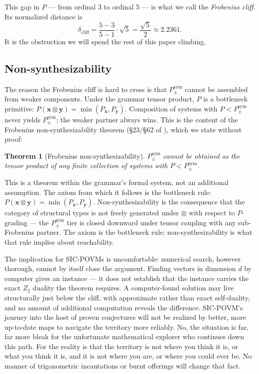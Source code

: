 \documentclass[12pt]{article}
\theoremstyle{plain}
\newtheorem{theoreminner}{Theorem}[section]
\theoremstyle{definition}
\theoremstyle{remark}
\newenvironment{theorem}{\begin{mdframed}[style=thmstyle]\begin{theoreminner}}{\end{theoreminner}\end{mdframed}}
\begin{document}
This gap in $P$ — from ordinal 3 to ordinal 5 — is what we call the \emph{Frobenius cliff}. Its normalized distance is
\[
  \delta_{\mathrm{cliff}} = \frac{5 - 3}{5 - 1} \cdot \sqrt{5} = \frac{\sqrt{5}}{2} \approx 2.2361.
\]
It is the obstruction we will spend the rest of this paper climbing.

\subsection{Non-synthesizability}

The reason the Frobenius cliff is hard to cross is that $P_\pm^{\mathrm{sym}}$ cannot be assembled from weaker components. Under the grammar tensor product, $P$ is a bottleneck primitive: $P(\mathbf{x} \otimes \mathbf{y}) = \min(P_\mathbf{x}, P_\mathbf{y})$. Composition of systems with $P < P_\pm^{\mathrm{sym}}$ never yields $P_\pm^{\mathrm{sym}}$; the weaker partner always wins. This is the content of the Frobenius non-synthesizability theorem (§23/§62 of \cite{synthref}), which we state without proof:

\begin{theorem}[Frobenius non-synthesizability]
  \label{thm:nonsyn}
  $P_\pm^{\mathrm{sym}}$ cannot be obtained as the tensor product of any finite collection of systems with $P < P_\pm^{\mathrm{sym}}$.
\end{theorem}

This is a theorem within the grammar's formal system, not an additional assumption. The axiom from which it follows is the bottleneck rule: $P(\mathbf{x} \otimes \mathbf{y}) = \min(P_\mathbf{x}, P_\mathbf{y})$. Non-synthesizability is the consequence that the category of structural types is not freely generated under $\otimes$ with respect to $P$-grading — the $P_\pm^{\mathrm{sym}}$ tier is closed downward under tensor coupling with any sub-Frobenius partner. The axiom is the bottleneck rule; non-synthesizability is what that rule implies about reachability.

The implication for SIC-POVMs is uncomfortable: numerical search, however thorough, cannot by itself close the argument. Finding vectors in dimension $d$ by computer gives an instance — it does not establish that the instance carries the exact $Z_2$ duality the theorem requires. A computer-found solution may live structurally just below the cliff, with approximate rather than exact self-duality, and no amount of additional computation reveals the difference. SIC-POVM's journey into the host of proven conjectures will not be realized by better, more up-to-date maps to navigate the territory more reliably. No, the situation is far, far more bleak for the unfortunate mathematical explorer who continues down this path. For the reality is that the territory is not where you think it is, or what you think it is, and it is not where you are, or where you could ever be. No manner of trigonometric incantations or burnt offerings will change that fact.
\end{document}
